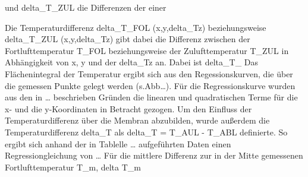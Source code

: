 und delta_T_ZUL die Differenzen der einer 


Die Temperaturdifferenz delta_T_FOL (x,y,delta_Tz)  beziehungsweise delta_T_ZUL (x,y,delta_Tz) gibt dabei die Differenz zwischen der Fortlufttemperatur T_FOL beziehungsweise der Zulufttemperatur T_ZUL in Abhängigkeit von x, y und der delta_Tz an. Dabei ist delta_T_ Das Flächenintegral der Temperatur ergibt sich aus den Regessionskurven, die über die gemessen Punkte gelegt werden (s.Abb…). Für die Regressionskurve wurden aus den in … beschrieben Gründen die linearen und quadratischen Terme für die x- und die y-Koordinaten in Betracht gezogen. Um den Einfluss der Temperaturdifferenz über die Membran abzubilden, wurde außerdem die Temperaturdifferenz delta_T als 
delta_T = T_AUL - T_ABL 
definierte. So ergibt sich anhand der in Tablelle … aufgeführten Daten einen Regressiongleichung von 
…
Für die mittlere Differenz zur in der Mitte gemessenen Fortlufttemperatur T_m, delta T_m
